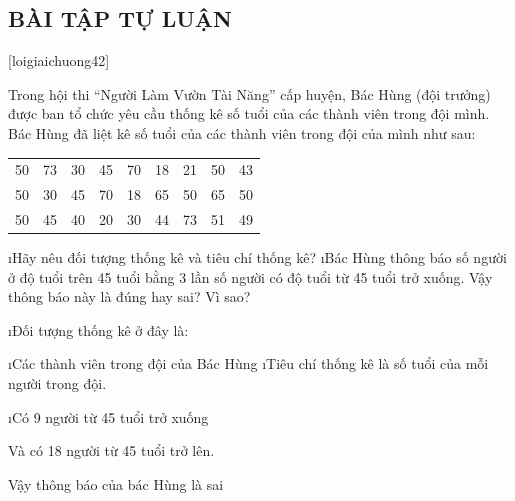 \subsection{BÀI TẬP TỰ LUẬN}
[loigiaichuong42]
\begin{bt}
	Trong hội thi “Người Làm Vườn Tài Năng” cấp huyện, Bác Hùng (đội trưởng) được ban tổ chức yêu cầu thống kê số tuổi của các thành viên trong đội mình. Bác Hùng đã liệt kê số tuổi của các thành viên trong đội của mình như sau:
	\begin{center}
		\begin{tabular}{|c c c c c c c c c|}
			\hline
			50 & 73& 30& 45& 70& 18& 21& 50& 43 \\
			50& 30& 45& 70& 18& 65& 50& 65& 50\\
			50&45&40&20&30&44&73&51&49\\
			\hline
		\end{tabular}
	\end{center}
	\begin{enumerate}[a),leftmargin=*]
		\i Hãy nêu đối tượng thống kê và tiêu chí thống kê?
		\i Bác Hùng thông báo số người ở độ tuổi trên 45 tuổi bằng 3 lần số người có độ tuổi từ 45 tuổi trở xuống. Vậy thông báo này là đúng hay sai? Vì sao?
	\end{enumerate}
	\begin{loigiaichuong42}
		\begin{enumerate}[a),leftmargin=*]
			\i Đối tượng thống kê ở đây là:
			\begin{enumerate}[+,leftmargin=*]
				\i Các thành viên trong đội của Bác Hùng
				\i Tiêu chí thống kê là số tuổi của mỗi người trong đội.
			\end{enumerate}
			\i Có 9 người từ  45 tuổi trở xuống
			
			Và có 18 người từ 45 tuổi trở lên.
			
			Vậy thông báo của bác Hùng là sai 
		\end{enumerate}
	\end{loigiaichuong42}
\end{bt}
